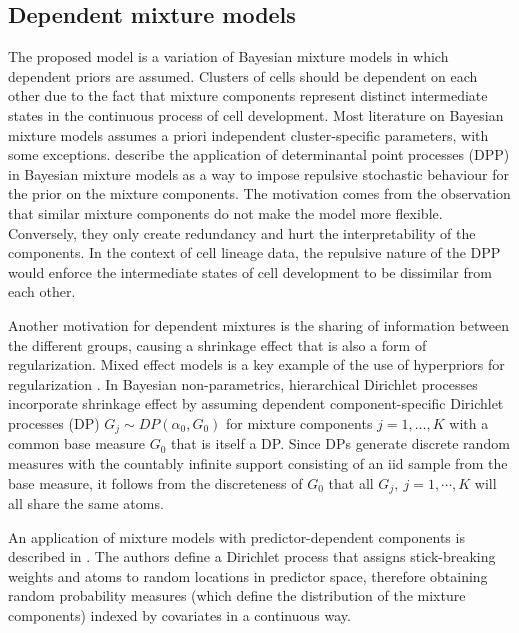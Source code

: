 \subsection{Dependent mixture models}

The proposed model is a variation of Bayesian mixture models in which dependent priors are assumed. 
Clusters of cells should be dependent on each other due to the fact that mixture components represent distinct intermediate states in the continuous process of cell development. 
Most literature on Bayesian mixture models assumes a priori independent cluster-specific parameters, with some exceptions. 
\cite{xu2016bayesian} describe the application of determinantal point processes (DPP) \citep{dpp_original} in Bayesian mixture models as a way to impose repulsive stochastic behaviour for the prior on the mixture components. 
The motivation comes from the observation that similar mixture components do not make the model more flexible. 
Conversely, they only create redundancy and hurt the interpretability of the components. 
In the context of cell lineage data, the repulsive nature of the DPP would enforce the intermediate states of cell development to be dissimilar from each other.

Another motivation for dependent mixtures is the sharing of information between the different groups, causing a shrinkage effect that is also a form of regularization. 
Mixed effect models is a key example of the use of hyperpriors for regularization \citep{lindstrom1990nonlinear,alston2012bayesian,lachos2013bayesian}.
In Bayesian non-parametrics, hierarchical Dirichlet processes \citep{HDP} incorporate shrinkage effect by assuming dependent component-specific Dirichlet processes (DP) $G_j \sim DP(\alpha_0, G_0)$ for mixture components $j=1, \dots, K$ with a common base measure $G_0$ that is itself a DP. 
Since DPs generate discrete random measures with the countably infinite support consisting of an iid sample from the base measure, it follows from the discreteness of $G_0$ that all $G_j, \ j=1, \cdots, K$ will all share the same atoms.


An application of mixture models with predictor-dependent components is described in \cite{chung2011local}. 
The authors define a Dirichlet process that assigns stick-breaking weights and atoms to random locations in predictor space, therefore obtaining random probability measures (which define the distribution of the mixture components) indexed by covariates in a continuous way.
 

